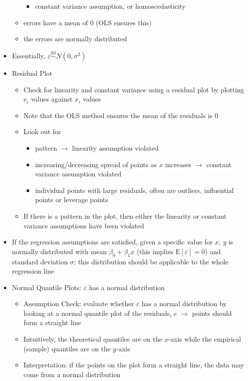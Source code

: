 \documentclass[12pt]{article}
\begin{document}
\begin{itemize}
\begin{itemize}
\begin{itemize}
\item constant variance assumption, or homoscedasticity \end{itemize} 
\item errors have a mean of $0$ (OLS ensures this) 
\item the errors are normally distributed \end{itemize} 
\item Essentially, $\varepsilon \stackrel{\text{iid}}{\sim} N(0, \sigma^2)$ 
\item Residual Plot \begin{itemize} 
\item Check for linearity and constant variance using a residual plot by plotting $e_i$ values against $x_i$ values 
\item Note that the OLS method ensures the mean of the residuals is $0$ 
\item Look out for \begin{itemize} 
\item pattern $\to$ linearity assumption violated 
\item increasing/decreasing spread of points as $x$ increases $\to$ constant variance assumption violated 
\item individual points with large residuals, often are outliers, influential points or leverage points \end{itemize} 
\item If there is a pattern in the plot, then either the linearity or constant variance assumptions have been violated \end{itemize} 
\item If the regression assumptions are satisfied, given a specific value for $x$, $y$ is normally distributed with mean $\beta_0 + \beta_1x$ (this implies $\text{E}[\varepsilon] = 0$) and standard deviation $\sigma$; this distribution should be applicable to the whole regression line 
\item Normal Quantile Plots: $\varepsilon$ has a normal distribution \begin{itemize} 
\item Assumption Check: evaluate whether $\varepsilon$ has a normal distribution by looking at a normal quantile plot of the residuals, $e$ $\to$ points should form a straight line 
\item Intuitively, the theoretical quantiles are on the $x$-axis while the empirical (sample) quantiles are on the $y$-axis 
\item Interpretation: if the points on the plot form a straight line, the data may come from a normal distribution \begin{itemize} 

\end{itemize}
\end{itemize}
\end{itemize}
\end{document}
